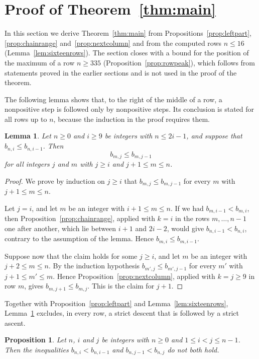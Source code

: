 \documentclass{amsart}
\newtheorem{proposition}[theorem]{Proposition}
\newtheorem{lemma}[theorem]{Lemma}
\theoremstyle{definition}
\theoremstyle{remark}
\numberwithin{equation}{section}
\begin{document}
\section{Proof of Theorem~\ref{thm:main}}\label{sec:proof}
In this section we derive Theorem~\ref{thm:main} from Propositions~\ref{prop:leftpart}, \ref{prop:chainrange} and~\ref{prop:nextcolumn} and from the computed rows $n\le 16$ (Lemma~\ref{lem:sixteenrows}). The section closes with a bound for the position of the maximum of a row $n\ge 335$ (Proposition~\ref{prop:rowpeak}), which follows from statements proved in the earlier sections and is not used in the proof of the theorem.

The following lemma shows that, to the right of the middle of a row, a nonpositive step is followed only by nonpositive steps. Its conclusion is stated for all rows up to $n$, because the induction in the proof requires them.

\begin{lemma}\label{lem:rightpart}
Let $n\ge 0$ and $i\ge 9$ be integers with $n\le 2i-1$, and suppose that $b_{n,i}\le b_{n,i-1}$. Then
\[
b_{m,j}\le b_{m,j-1}
\]
for all integers $j$ and $m$ with $j\ge i$ and $j+1\le m\le n$.
\end{lemma}

\begin{proof}
We prove by induction on $j\ge i$ that $b_{m,j}\le b_{m,j-1}$ for every $m$ with $j+1\le m\le n$.

Let $j=i$, and let $m$ be an integer with $i+1\le m\le n$. If we had $b_{m,i-1}<b_{m,i}$, then Proposition~\ref{prop:chainrange}, applied with $k=i$ in the rows $m,\dots,n-1$ one after another, which lie between $i+1$ and $2i-2$, would give $b_{n,i-1}<b_{n,i}$, contrary to the assumption of the lemma. Hence $b_{m,i}\le b_{m,i-1}$.

Suppose now that the claim holds for some $j\ge i$, and let $m$ be an integer with $j+2\le m\le n$. By the induction hypothesis $b_{m',j}\le b_{m',j-1}$ for every $m'$ with $j+1\le m'\le m$. Hence Proposition~\ref{prop:nextcolumn}, applied with $k=j\ge 9$ in row $m$, gives $b_{m,j+1}\le b_{m,j}$. This is the claim for $j+1$.
\end{proof}

Together with Proposition~\ref{prop:leftpart} and Lemma~\ref{lem:sixteenrows}, Lemma~\ref{lem:rightpart} excludes, in every row, a strict descent that is followed by a strict ascent.

\begin{proposition}\label{prop:descentascent}
Let $n$, $i$ and $j$ be integers with $n\ge 0$ and $1\le i<j\le n-1$. Then the inequalities $b_{n,i}<b_{n,i-1}$ and $b_{n,j-1}<b_{n,j}$ do not both hold.
\end{proposition}
\end{document}
